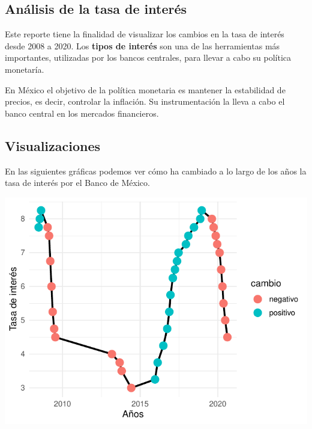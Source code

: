 \documentclass[
]{article}
\author{

}
\title{}
\begin{document}
\hypertarget{anuxe1lisis-de-la-tasa-de-interuxe9s}{%
\subsection{Análisis de la tasa de
interés}\label{anuxe1lisis-de-la-tasa-de-interuxe9s}}

Este reporte tiene la finalidad de visualizar los cambios en la tasa de
interés desde 2008 a 2020. Los \textbf{tipos de interés} son una de las
herramientas más importantes, utilizadas por los bancos centrales, para
llevar a cabo su política monetaría.

En México el objetivo de la política monetaria es mantener la
estabilidad de precios, es decir, controlar la inflación. Su
instrumentación la lleva a cabo el banco central en los mercados
financieros.

\hypertarget{visualizaciones}{%
\subsection{Visualizaciones}\label{visualizaciones}}

En las siguientes gráficas podemos ver cómo ha cambiado a lo largo de
los años la tasa de interés por el Banco de México.

\begin{CodeChunk}


\begin{center}\includegraphics{reporte_tasa_files/figure-latex/graph1-1} \end{center}

\end{CodeChunk}
\end{document}
